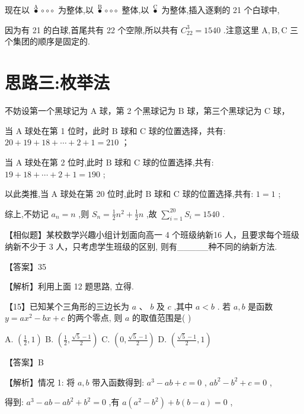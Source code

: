 \documentclass[10pt]{article}
\newcommand*\circled[1]{\tikz[baseline=(char.base)]{\node[shape=circle,draw,inner sep=1.5pt] (char) {\small #1};}}
\begin{document}
现在以 \(\overset{\mathrm{A}}{ \bullet  } \circ   \circ   \circ\) 为整体,以 \(\overset{\mathrm{B}}{ \bullet  } \circ   \circ   \circ\) 整体,以 \(\overset{\mathrm{C}}{ \bullet  }\) 为整体,插入逐剩的 21 个白球中,

因为有 21 的白球,首尾共有 22 个空隙,所以共有 \({C}_{22}^{3} = {1540}\) .注意这里 \(\mathrm{A},\mathrm{B},\mathrm{C}\) 三个集团的顺序是固定的.

\section*{思路三:枚举法}

不妨设第一个黑球记为 \(\mathrm{A}\) 球，第 2 个黑球记为 \(\mathrm{B}\) 球，第三个黑球记为 \(\mathrm{C}\) 球，

当 \(\mathrm{A}\) 球处在第 1 位时，此时 \(\mathrm{B}\) 球和 \(\mathrm{C}\) 球的位置选择，共有: \({20} + {19} + {18} + \cdots  + 2 + 1 = {210}\) ；

当 \(\mathrm{A}\) 球处在第 2 位时,此时 \(\mathrm{B}\) 球和 \(\mathrm{C}\) 球的位置选择,共有: \({19} + {18} + \cdots  + 2 + 1 = {190}\) ;

以此类推,当 \(\mathrm{A}\) 球处在第 20 位时,此时 \(\mathrm{B}\) 球和 \(\mathrm{C}\) 球的位置选择,共有: \(1 = 1\) ;

综上,不妨记 \({a}_{n} = n\) ,则 \({S}_{n} = \frac{1}{2}{n}^{2} + \frac{1}{2}n\) ,故 \(\mathop{\sum }\limits_{{i = 1}}^{{20}}{S}_{i} = {1540}\) .

【相似题】某校数学兴趣小组计划面向高一 4 个班级纳新16 人，且要求每个班级纳新不少于 3 人，只考虑学生班级的区别, 则有\_\_\_\_\_种不同的纳新方法.

【答案】35

【解析】利用上面 12 题思路, 立得.

【15】已知某个三角形的三边长为 \(a\text{ 、 }b\) 及 \(c\) ,其中 \(a < b\) . 若 \(a,b\) 是函数 \(y = a{x}^{2} - {bx} + c\) 的两个零点, 则 \(a\) 的取值范围是( )

A. \(\left( {\frac{1}{2},1}\right)\) B. \(\left( {\frac{1}{2},\frac{\sqrt{5} - 1}{2}}\right)\) C. \(\left( {0,\frac{\sqrt{5} - 1}{2}}\right)\) D. \(\left( {\frac{\sqrt{5} - 1}{2},1}\right)\)

【答案】B

【解析】情况 1: 将 \(a,b\) 带入函数得到: \({a}^{3} - {ab} + c = 0\)  \circled{1} , \(a{b}^{2} - {b}^{2} + c = 0\)  \circled{2} ,

得到: \({a}^{3} - {ab} - a{b}^{2} + {b}^{2} = 0\) ,有 \(a\left( {{a}^{2} - {b}^{2}}\right)  + b\left( {b - a}\right)  = 0\) ,
\end{document}
